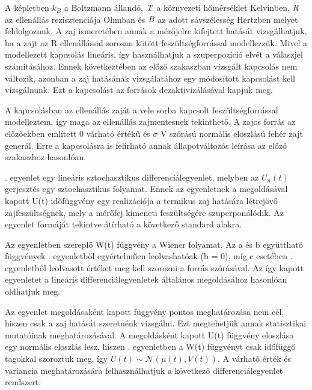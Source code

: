 A képletben $k_B$ a Boltzmann állandó, $\it{T}$ a környezeti hőmérséklet Kelvinben, $\it{R}$ az ellenállás rezisztenciája Ohmban és $\it{B}$ az adott sávszélesség Hertzben melyet feldolgozunk. A zaj ismeretében annak a mérőjelre kifejtett hatását vizsgálhatjuk, ha a zajt az R ellenállással sorosan kötött feszültségforrással modellezzük. Mivel a modellezett kapcsolás lineáris, így használhatjuk a szuperpozíció elvét a válaszjel számításához. Ennek következtében az előző szakaszban vizsgált kapcsolás nem változik, azonban a zaj hatásának vizsgálatához egy módosított kapcsolást kell vizsgálnunk. Ezt a kapcsolást az források dezaktivizálásával kapjuk meg.


A kapcsolásban az ellenállás zaját a vele sorba kapcsolt feszültségforrással modelleztem, így maga az ellenállás zajmentesnek tekinthető. A zajos forrás az előzőekben említett 0 várható értékű és $\sigma$ V szórású normális eloszlású fehér zajt generál. Erre a kapcsolásra is felírható annak állapotváltozós leírása az előző szakaszhoz hasonlóan.


. egyenlet egy lineáris sztochasztikus differenciálegyenlet, melyben az $U_n(t)$ gerjesztés egy sztochasztikus folyamat. Ennek az egyenletnek a megoldásával kapott U(t) időfüggvény egy realizációja a termikus zaj hatására létrejövő zajfeszültségnek, mely a mérőfej kimeneti feszültségére szuperponálódik. Az egyenlet formáját tekintve átírható a következő standard alakra.


Az egyenletben szereplő W(t) függvény a Wiener folyamat\cite{Wiener}. Az a és b együttható függvények . egyenletből egyértelműen leolvashatóak (b = 0), míg c esetében . egyenletből leolvasott értéket meg kell szorozni a forrás szórásával. Az így kapott egyenletet a lineáris differenciálegyenletek általános megoldásához hasonlóan oldhatjuk meg.


Az egyenlet megoldásaként kapott függvény pontos meghatározása nem cél, hiszen csak a zaj hatását szeretnénk vizsgálni. Ezt megtehetjük annak statisztikai mutatóinak meghatározásával. A megoldásként kapott U(t) függvény eloszlása egy normális eloszlás lesz, hiszen . egyenletben a W(t) függvényt csak időfüggő tagokkal szoroztuk meg, így $U(t) \sim \mathcal{N}(\mu(t),V(t))$. A várható érték és variancia meghatározására felhasználhatjuk a következő differenciálegyenlet rendszert\cite{SDE}:

